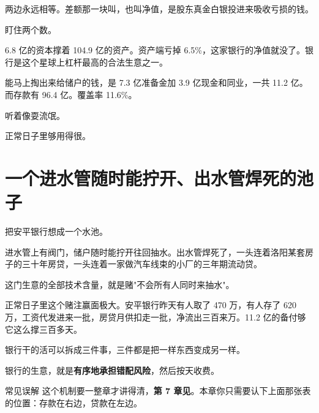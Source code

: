 两边永远相等。差额那一块叫，也叫净值，是股东真金白银投进来吸收亏损的钱。

盯住两个数。

6.8 亿的资本撑着 104.9 亿的资产。资产端亏掉 6.5\%，这家银行的净值就没了。银行是这个星球上杠杆最高的合法生意之一。

能马上掏出来给储户的钱，是 7.3 亿准备金加 3.9 亿现金和同业，一共 11.2 亿。而存款有 96.4 亿。覆盖率 11.6\%。

听着像耍流氓。

正常日子里够用得很。

\section{一个进水管随时能拧开、出水管焊死的池子}

把安平银行想成一个水池。

进水管上有阀门，储户随时能拧开往回抽水。出水管焊死了，一头连着洛阳某套房子的三十年房贷，一头连着一家做汽车线束的小厂的三年期流动贷。

这门生意的全部技术含量，就是赌"不会所有人同时来抽水"。

正常日子里这个赌注赢面极大。安平银行昨天有人取了 470 万，有人存了 620 万，工资代发进来一批，房贷月供扣走一批，净流出三百来万。11.2 亿的备付够它这么撑三百多天。

银行干的活可以拆成三件事，三件都是把一样东西变成另一样。

\begin{flowlist}
\end{flowlist}

\begin{pullquote}{}
银行的生意，就是\textbf{有序地承担错配风险}，然后按天收费。
\end{pullquote}

\begin{mythbox}{常见误解}
这个机制要一整章才讲得清，\textbf{第 7 章见}。本章你只需要认下上面那张表的位置：存款在右边，贷款在左边。

\end{mythbox}

